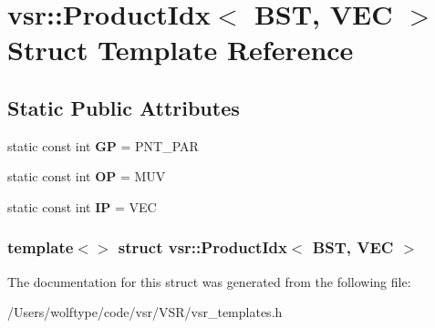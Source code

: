 \hypertarget{structvsr_1_1_product_idx_3_01_b_s_t_00_01_v_e_c_01_4}{\section{vsr\-:\-:Product\-Idx$<$ B\-S\-T, V\-E\-C $>$ Struct Template Reference}
\label{structvsr_1_1_product_idx_3_01_b_s_t_00_01_v_e_c_01_4}
}
\subsection*{Static Public Attributes}
\begin{DoxyCompactItemize}
\item 
\hypertarget{structvsr_1_1_product_idx_3_01_b_s_t_00_01_v_e_c_01_4_ab7d561b8138197740f5f9a0a324e8226}{static const int {\bfseries G\-P} = P\-N\-T\-\_\-\-P\-A\-R}\label{structvsr_1_1_product_idx_3_01_b_s_t_00_01_v_e_c_01_4_ab7d561b8138197740f5f9a0a324e8226}

\item 
\hypertarget{structvsr_1_1_product_idx_3_01_b_s_t_00_01_v_e_c_01_4_a23ce69d969eb6421eee8f3a629aa2bae}{static const int {\bfseries O\-P} = M\-U\-V}\label{structvsr_1_1_product_idx_3_01_b_s_t_00_01_v_e_c_01_4_a23ce69d969eb6421eee8f3a629aa2bae}

\item 
\hypertarget{structvsr_1_1_product_idx_3_01_b_s_t_00_01_v_e_c_01_4_a310de51d98a4ef74138bad06f05b09e5}{static const int {\bfseries I\-P} = V\-E\-C}\label{structvsr_1_1_product_idx_3_01_b_s_t_00_01_v_e_c_01_4_a310de51d98a4ef74138bad06f05b09e5}

\end{DoxyCompactItemize}
\subsubsection*{template$<$$>$ struct vsr\-::\-Product\-Idx$<$ B\-S\-T, V\-E\-C $>$}



The documentation for this struct was generated from the following file\-:\begin{DoxyCompactItemize}
\item 
/\-Users/wolftype/code/vsr/\-V\-S\-R/vsr\-\_\-templates.\-h\end{DoxyCompactItemize}
